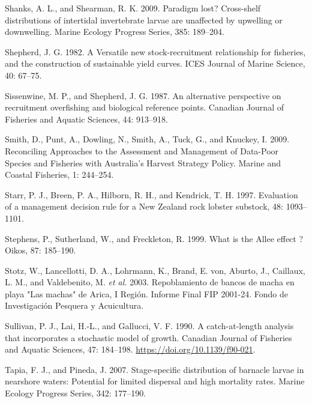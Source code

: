 \documentclass[12pt]{article}
\begin{document}
\leavevmode\hypertarget{ref-Shanks2009}{}%
Shanks, A. L., and Shearman, R. K. 2009. Paradigm lost? Cross-shelf
distributions of intertidal invertebrate larvae are unaffected by
upwelling or downwelling. Marine Ecology Progress Series, 385: 189--204.

\leavevmode\hypertarget{ref-Shepherd1982}{}%
Shepherd, J. G. 1982. A Versatile new stock-recruitment relationship for
fisheries, and the construction of sustainable yield curves. ICES
Journal of Marine Science, 40: 67--75.

\leavevmode\hypertarget{ref-Sissenwine1987}{}%
Sissenwine, M. P., and Shepherd, J. G. 1987. An alternative perspective
on recruitment overfishing and biological reference points. Canadian
Journal of Fisheries and Aquatic Sciences, 44: 913--918.

\leavevmode\hypertarget{ref-Smith2009}{}%
Smith, D., Punt, A., Dowling, N., Smith, A., Tuck, G., and Knuckey, I.
2009. Reconciling Approaches to the Assessment and Management of
Data-Poor Species and Fisheries with Australia's Harvest Strategy
Policy. Marine and Coastal Fisheries, 1: 244--254.

\leavevmode\hypertarget{ref-Starr1997}{}%
Starr, P. J., Breen, P. A., Hilborn, R. H., and Kendrick, T. H. 1997.
Evaluation of a management decision rule for a New Zealand rock lobster
substock, 48: 1093--1101.

\leavevmode\hypertarget{ref-Stephens1999}{}%
Stephens, P., Sutherland, W., and Freckleton, R. 1999. What is the Allee
effect ? Oikos, 87: 185--190.

\leavevmode\hypertarget{ref-Stotz2003}{}%
Stotz, W., Lancellotti, D. A., Lohrmann, K., Brand, E. von, Aburto, J.,
Caillaux, L. M., and Valdebenito, M. \emph{et al.} 2003. Repoblamiento
de bancos de macha en playa "Las machas" de Arica, I Región. Informe
Final FIP 2001-24. Fondo de Investigación Pesquera y Acuicultura.

\leavevmode\hypertarget{ref-Sullivan1990}{}%
Sullivan, P. J., Lai, H.-L., and Gallucci, V. F. 1990. A catch-at-length
analysis that incorporates a stochastic model of growth. Canadian
Journal of Fisheries and Aquatic Sciences, 47: 184--198.
\url{https://doi.org/10.1139/f90-021}.

\leavevmode\hypertarget{ref-Tapia2007}{}%
Tapia, F. J., and Pineda, J. 2007. Stage-specific distribution of
barnacle larvae in nearshore waters: Potential for limited dispersal and
high mortality rates. Marine Ecology Progress Series, 342: 177--190.
\end{document}
